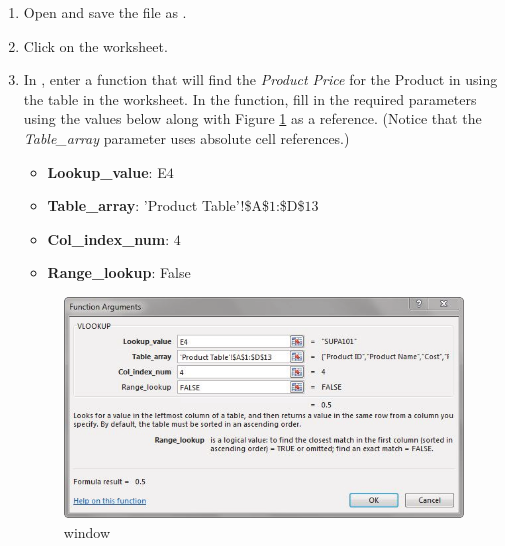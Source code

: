 \begin{enumbox}
	\begin{enumerate}
		\item Open  and save the file as .
		\item Click on the  worksheet.
		\item In , enter a  function that will find the \textit{Product Price} for the Product in  using the table in the  worksheet. In the  function, fill in the required parameters using the values below along with Figure \ref{05:fig32} as a reference. (Notice that the \textit{Table\_array} parameter uses absolute cell references.)
		
		\begin{itemize}
			\item \textbf{Lookup\_value}: E$ 4 $
			\item \textbf{Table\_array}: 'Product Table'!\$A\$$ 1 $:\$D\$$ 13 $
			\item \textbf{Col\_index\_num}: $ 4 $
			\item \textbf{Range\_lookup}: False
		\end{itemize}
	
		\begin{figure}[H]
			\centering
			\includegraphics[width=\maxwidth{.95\linewidth}]{gfx/ch05_fig32}
			\caption{ window}
			\label{05:fig32}
		\end{figure}


\end{enumerate}
\end{enumbox}

